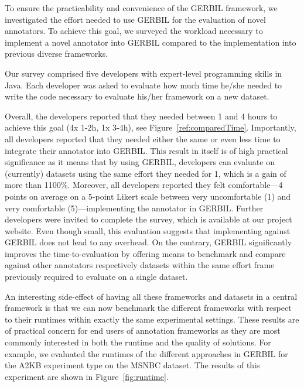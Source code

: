 To ensure the practicability and convenience of the GERBIL framework, we investigated the effort needed to use GERBIL for the evaluation of novel annotators.
To achieve this goal, we surveyed the workload necessary to implement a novel annotator into GERBIL compared to the implementation into previous diverse frameworks.

Our survey comprised five developers with expert-level programming skills in Java. Each developer was asked to evaluate how much time he/she needed to write the code necessary to evaluate his/her framework on a new dataset.



Overall, the developers reported that they needed between 1 and 4 hours to achieve this goal (4x 1-2h, 1x 3-4h), see Figure~\ref{ref:comparedTime}.
Importantly, all developers reported that they needed either the same or even less time to integrate their annotator into GERBIL.
This result in itself is of high practical significance as it means that by using GERBIL, developers can evaluate on (currently) \overalldatasets datasets using the same effort they needed for 1, which is a gain of more than 1100\%.
Moreover, all developers reported they felt comfortable---4 points on average on a 5-point Likert scale between very uncomfortable (1) and very comfortable (5)---implementing the annotator in GERBIL.
Further developers were invited to complete the survey, which is available at our project website.
Even though small, this evaluation suggests that implementing against GERBIL does not lead to any overhead. On the contrary, GERBIL significantly improves the time-to-evaluation by offering means to benchmark and compare against other annotators respectively datasets within the same effort frame previously required to evaluate on a single dataset.

An interesting side-effect of having all these frameworks and datasets in a central framework is that we can now benchmark the different frameworks with respect to their runtimes within exactly the same experimental settings. These results are of practical concern for end users of annotation frameworks as they are most commonly interested in both the runtime and the quality of solutions. For example, we evaluated the runtimes of the different approaches in GERBIL for the A2KB experiment type on the MSNBC dataset. The results of this experiment are shown in Figure~\ref{fig:runtime}.


